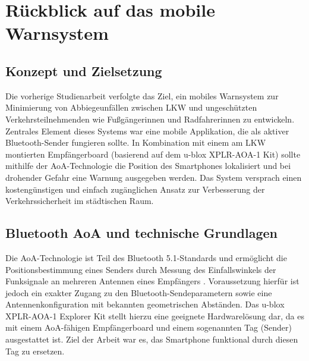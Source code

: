 \documentclass[a4paper, 12pt]{article} %
\begin{document}
\clearpage

\section{Rückblick auf das mobile Warnsystem}
\subsection{Konzept und Zielsetzung}
Die vorherige Studienarbeit verfolgte das Ziel, ein mobiles Warnsystem zur Minimierung von 
Abbiegeunfällen zwischen \ac{LKW} und ungeschützten Verkehrsteilnehmenden wie Fußgängerinnen und Radfahrerinnen zu entwickeln.
Zentrales Element dieses Systems war eine mobile Applikation, die als aktiver Bluetooth-Sender fungieren sollte. In Kombination 
mit einem am \ac{LKW} montierten Empfängerboard (basierend auf dem u-blox XPLR-AOA-1 Kit) sollte mithilfe der \acf{AoA}-Technologie 
die Position des Smartphones lokalisiert und bei drohender Gefahr eine Warnung ausgegeben werden. Das System versprach einen 
kostengünstigen und einfach zugänglichen Ansatz zur Verbesserung der Verkehrssicherheit im städtischen Raum.

\subsection{Bluetooth AoA und technische Grundlagen}
Die \acf{AoA}-Technologie ist Teil des Bluetooth 5.1-Standards und ermöglicht die Positionsbestimmung
eines Senders durch Messung des Einfallswinkels der Funksignale an mehreren Antennen eines Empfängers \cite{miller2021bluetooth,uBloxAoAWhitepaper}. 
Voraussetzung hierfür ist jedoch ein exakter Zugang zu den Bluetooth-Sendeparametern sowie eine Antennenkonfiguration 
mit bekannten geometrischen Abständen. Das u-blox XPLR-AOA-1 Explorer Kit stellt hierzu eine geeignete Hardwarelösung dar, 
da es mit einem \ac{AoA}-fähigen Empfängerboard und einem sogenannten Tag (Sender) ausgestattet ist. Ziel der Arbeit war es, das Smartphone 
funktional durch diesen Tag zu ersetzen.
\end{document}

